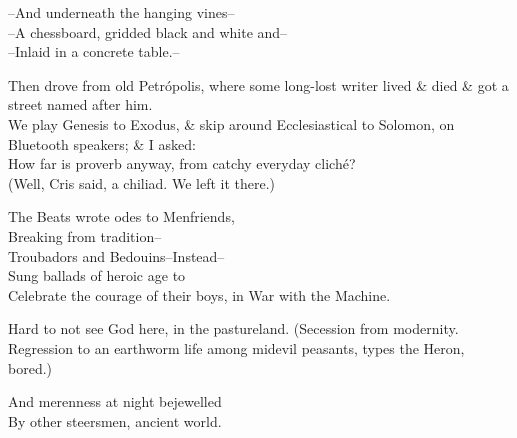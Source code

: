 --And underneath the hanging vines-- \\
--A chessboard, gridded black and white and-- \\
--Inlaid in a concrete table.--

Then drove from old Petrópolis, where some long-lost writer lived \& died \& got a street named after him. \\
We play Genesis to Exodus, \& skip around Ecclesiastical to Solomon, on Bluetooth speakers; \& I asked: \\
How far is proverb anyway, from catchy everyday cliché? \\
(Well, Cris said, a chiliad. We left it there.)

The Beats wrote odes to Menfriends, \\
Breaking from tradition-- \\
Troubadors and Bedouins--Instead-- \\
Sung ballads of heroic age to \\
Celebrate the courage of their boys, in War with the Machine.

Hard to not see God here, in the pastureland. (Secession from modernity. Regression to an earthworm life among midevil peasants, types the Heron, bored.)

And merenness at night bejewelled \\
By other steersmen, ancient world. \\


